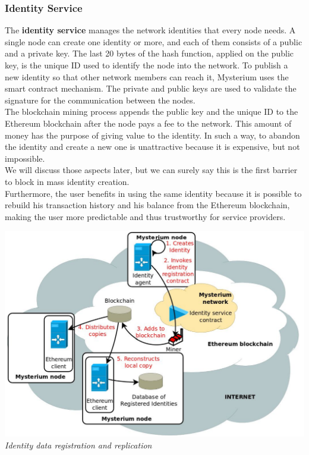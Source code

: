 \documentclass[12pt]{article}
\begin{document}
	\subsubsection{Identity Service}
	The \textbf{identity service} manages the network identities that every node needs. A single node can create one identity or more, and each of them consists of a public and a private key. The last 20 bytes of the hash function, applied on the public key, is the unique ID used to identify the node into the network. To publish a new identity so that other network members can reach it, Mysterium uses the smart contract mechanism. The private and public keys are used to validate the signature for the communication between the nodes.\\
	The blockchain mining process appends the public key and the unique ID to the Ethereum blockchain after the node pays a fee to the network. This amount of money has the purpose of giving value to the identity. In such a way, to abandon the identity and create a new one is unattractive because it is expensive, but not impossible.\\ 
	We will discuss those aspects later, but we can surely say this is the first barrier to block in mass identity creation.\\
	Furthermore, the user benefits in using the same identity because it is possible to rebuild his transaction history and his balance from the Ethereum blockchain, making the user more predictable and thus trustworthy for service providers.\\

	\bigbreak
	\begin{center}
		\includegraphics[width=1\linewidth]{images/mysterium_identity_creation.png}\\
		\small{\textit{Identity data registration and replication}}
	\end{center}
\end{document}
